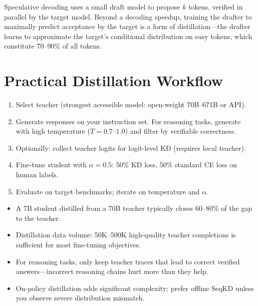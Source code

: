 Speculative decoding \parencite{leviathan2023fast} uses a small draft model to propose $k$ tokens, verified in parallel by the target model. Beyond a decoding speedup, training the drafter to maximally predict acceptance by the target is a form of distillation---the drafter learns to approximate the target's conditional distribution on easy tokens, which constitute 70--90\% of all tokens.

\section{Practical Distillation Workflow}

\begin{enumerate}
  \item Select teacher (strongest accessible model: open-weight 70B--671B or API).
  \item Generate responses on your instruction set. For reasoning tasks, generate with high temperature ($T = 0.7$--$1.0$) and filter by verifiable correctness.
  \item Optionally: collect teacher logits for logit-level KD (requires local teacher).
  \item Fine-tune student with $\alpha = 0.5$: 50\% KD loss, 50\% standard CE loss on human labels.
  \item Evaluate on target benchmarks; iterate on temperature and $\alpha$.
\end{enumerate}

\begin{keyinsight}
\begin{itemize}
  \item A 7B student distilled from a 70B teacher typically closes 60--80\% of the gap to the teacher.
  \item Distillation data volume: 50K--500K high-quality teacher completions is sufficient for most fine-tuning objectives.
  \item For reasoning tasks, only keep teacher traces that lead to correct verified answers---incorrect reasoning chains hurt more than they help.
  \item On-policy distillation adds significant complexity; prefer offline SeqKD unless you observe severe distribution mismatch.
\end{itemize}
\end{keyinsight}


